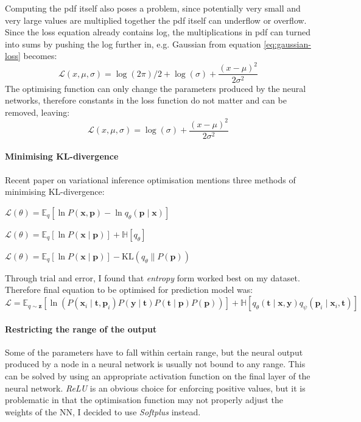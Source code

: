 \documentclass[12pt,a4paper]{book}
\newcommand\bs[1]{\boldsymbol{#1}}
\begin{document}
Computing the pdf itself also poses a problem, since potentially very small and very large values are multiplied together the pdf itself can underflow or overflow.
Since the loss equation already contains log, the multiplications in pdf can turned into sums by pushing the log further in, e.g. Gaussian from equation \ref{eq:gaussian-loss} becomes:
\begin{equation}
\mathcal{L}(x,\mu,\sigma) = \log(2\pi)/2+\log(\sigma)+\frac{(x-\mu)^2}{2\sigma^2}
\end{equation}
The optimising function can only change the parameters produced by the neural networks, therefore constants in the loss function do not matter and can be removed, leaving:
\begin{equation}
\mathcal{L}(x,\mu,\sigma) = \log(\sigma)+\frac{(x-\mu)^2}{2\sigma^2}
\label{eq:gaussian-log-loss}
\end{equation}

\paragraph{Minimising KL-divergence}
Recent paper on variational inference optimisation \cite{variationalmethods} mentions three methods of minimising KL-divergence:
\begin{description}[labelwidth=\widthof{\bfseries Entropy form }]
\item[FMC form] $\mathcal{L}(\theta) = \mathbb{E}_{q}[\ln P(\bs{x},\bs{p}) - \ln q_\theta(\bs{p}\mid\bs{x})]$
\item[Entropy form] $\mathcal{L}(\theta) = \mathbb{E}_{q}[\ln P(\bs{x}\mid\bs{p})] + \mathbb{H}[q_\theta]$
\item[KL form] $\mathcal{L}(\theta) = \mathbb{E}_{q}[\ln P(\bs{x}\mid\bs{p})] - \text{KL}(q_\theta \parallel P(\bs{p}))$
\end{description}
Through trial and error, I found that \emph{entropy} form worked best on my dataset.
Therefore final equation to be optimised for prediction model was:
\begin{equation}
\mathcal{L} = \mathbb{E}_{q\sim\bs{z}}[\ln(P(\bs{x}_i\mid\bs{t},\bs{p}_i)P(\bs{y}\mid\bs{t})P(\bs{t}\mid\bs{p})P(\bs{p}))] + \mathbb{H}[q_\theta(\bs{t}\mid\bs{x},\bs{y})q_\psi(\bs{p}_i\mid\bs{x}_i,\bs{t})]
\end{equation}
\paragraph{Restricting the range of the output}
Some of the parameters have to fall within certain range, but the neural output produced by a node in a neural network is usually not bound to any range.
This can be solved by using an appropriate activation function on the final layer of the neural network.
\emph{ReLU} is an obvious choice for enforcing positive values, but it is problematic in that the optimisation function may not properly adjust the weights of the NN, I decided to use \emph{Softplus} instead.
\end{document}
